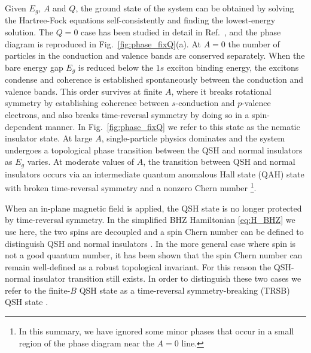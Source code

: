 \documentclass[reprint,aps,superscriptaddress]{revtex4-2}
\begin{document}
Given $E_g$, $A$ and $Q$, the ground state of the system can be obtained by solving the Hartree-Fock equations self-consistently and finding the lowest-energy solution. The $Q=0$ case has been studied in detail in Ref.~, and the phase diagram is reproduced in Fig.~\ref{fig:phase_fixQ}(a). At $A=0$ the 
number of particles in the conduction and valence bands are conserved separately. When the bare energy 
gap $E_g$ is reduced below the $1s$ exciton binding energy, the excitons condense and 
coherence is established spontaneously between the conduction and valence bands.
This order survives at finite $A$, where it breaks rotational symmetry by establishing 
coherence between $s$-conduction and $p$-valence electrons, and also breaks time-reversal symmetry by doing so in a 
spin-dependent manner.
In Fig.~\ref{fig:phase_fixQ} we refer to this state as the nematic insulator state. 
At large $A$, single-particle physics dominates and the system undergoes a topological phase transition between the QSH and normal insulators as $E_g$ varies. At moderate values of $A$, the transition between QSH and normal insulators
occurs via an intermediate quantum anomalous Hall state (QAH) state with 
broken time-reversal symmetry and a nonzero Chern number \footnote{In this summary, 
we have ignored some minor phases that occur in a small region of the phase diagram near the $A=0$ line.}.

When an in-plane magnetic field is applied, the QSH state is no longer protected by time-reversal symmetry. 
In the simplified BHZ Hamiltonian \eqref{eq:H_BHZ} we use here, the two spins are decoupled and a spin Chern number can be defined to distinguish QSH and normal insulators \cite{sheng2006quantum}. In the more general case where spin is not a good quantum number, it has been shown that \cite{prodan2009robustness,yang2011time,vanderbilt2018berry} the spin Chern number can remain well-defined as a robust topological invariant. For this reason the QSH-normal insulator transition still exists.  In order to distinguish these two cases 
we refer to the finite-$B$ QSH state as a time-reversal symmetry-breaking (TRSB) QSH state \cite{yang2011time}.
\end{document}
